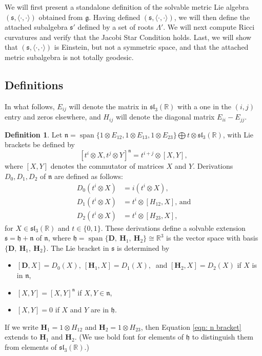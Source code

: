 \documentclass[12pt]{amsart}
\newcommand{\bfD}{\ensuremath{\mathbf D} }
\newcommand{\bfH}{\ensuremath{\mathbf H} }
\newcommand\boldR{\ensuremath{\mathbb R}}
\newcommand{\myspan}{\operatorname{span}}
\newcommand{\frakg}{\ensuremath{\mathfrak{g}} }
\newcommand{\frakh}{\ensuremath{\mathfrak{h}} }
\newcommand{\frakn}{\ensuremath{\mathfrak{n}} }
\newcommand{\fraks}{\ensuremath{\mathfrak{s}} }
\newcommand\fraksl{{\mathfrak{sl}}}
\newcommand\ip{{\langle\cdot {,} \cdot\rangle}}
\theoremstyle{plain}
\theoremstyle{definition}
\newtheorem{defn}[theorem]{Definition}
\theoremstyle{remark}
\numberwithin{equation}{section}
\numberwithin{theorem}{section}
\begin{document}
We will  first present a standalone definition of the  solvable metric Lie
algebra $(\fraks,\ip)$ obtained from $\frakg.$   Having defined
$(\fraks,\ip)$, we will then 
define the attached subalgebra $\fraks'$ defined by  a
set of roots $\Lambda'$.   We will next 
compute Ricci curvatures and verify that
the Jacobi Star Condition holds.  Last, we will show that $(\fraks,\ip)$  is
Einstein, but not a symmetric space, and that the attached metric subalgebra
is not totally geodesic. 
\subsection{Definitions}
In what follows, $E_{ij}$ will denote the matrix in $\fraksl_3(\boldR)$ with a one in the $(i,j)$ entry and zeros elsewhere, and  $H_{ij}$ will denote the diagonal 
matrix $E_{ii} - E_{jj}$.
\begin{defn}
Let $\frakn = \myspan \{ 1 \otimes E_{12}, 1 \otimes E_{13}, 1 \otimes E_{23}\} \bigoplus t \otimes \fraksl_3(\boldR)$, with Lie 
brackets be defined by 
\begin{equation}\label{eqn: n bracket} [t^i \otimes X, t^j \otimes Y]^{\frakn} =  t^{i+j} \otimes  [X,Y],\end{equation}
where $[X,Y]$ denotes the commutator of matrices $X$ and $Y$. 
Derivations $D_0, D_1, D_2$ of $\frakn$ are defined as follows: 
  \begin{align*} D_0(t^i \otimes X) &=  i (t^i \otimes  X ), \\
  D_1(t^i \otimes X) &= t^i \otimes [H_{12}, X ],\, \text{and}  \\
   D_2(t^i \otimes X) &= t^i \otimes [H_{23}, X ], \end{align*}
  for $X \in \fraksl_3(\boldR)$ and $t \in \{0,1\}$.
These derivations define a solvable extension $\fraks = \frakh + \frakn$ of $\frakn$, where  $\frakh  = \myspan \{  \bfD,~\bfH_1,~\bfH_2 \} \cong \boldR^3 $
is the vector space with basis $\{\bfD,~\bfH_1,~\bfH_2\}$.
  The Lie bracket in $\fraks$ is determined by 
\begin{itemize}
\item $[\bfD,X] = D_0(X),~ [\bfH_1, X] = D_1(X),~$ and $[\bfH_2, X]  =D_2(X)$ if $X$ is in $\frakn$, 
\item  $[X,Y] = [X,Y]^\frakn$ if $X , Y \in \frakn$, 
\item $[X,Y]=0$ if $X$ and $Y$ are in $\frakh$. 
\end{itemize}
If we write  $\bfH_1 = 1 \otimes H_{12}$ and $\bfH_2 = 1\otimes H_{23}$, then Equation \eqref{eqn: n bracket} extends to $\bfH_1$ and $\bfH_2.$
(We use bold font for elements of $\frakh$ to distinguish them from elements of $\fraksl_3(\boldR).$)


\end{defn}
\end{document}
